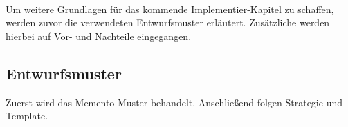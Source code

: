 \\
Um weitere Grundlagen für das kommende Implementier-Kapitel zu schaffen, werden zuvor die verwendeten Entwurfsmuster erläutert. Zusätzliche werden hierbei auf Vor- und Nachteile eingegangen.
\subsection{Entwurfsmuster}
Zuerst wird das Memento-Muster behandelt. Anschließend folgen Strategie und Template.
